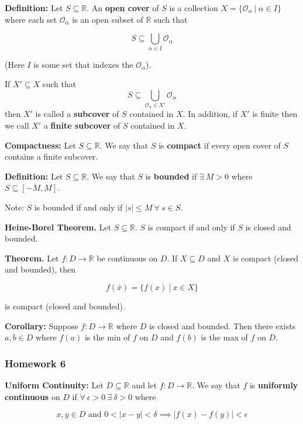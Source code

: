 \textbf{Definition:} Let \(S \subseteq \mathbb{R}\). An \textbf{open cover} of \(S\) is a collection \(X = \{\mathcal{O}_\alpha \ | \ \alpha \in I \} \) where each set \(\mathcal{O}_\alpha\) is an open subset of \(\mathbb{R}\) such that

\[
S \subseteq \bigcup_{\alpha \in I} \mathcal{O}_\alpha
\]

(Here \(I\) is some set that indexes the \(\mathcal{O}_\alpha\)).

If \(X' \subseteq X\) such that \[S \subseteq  \bigcup_{\mathcal{O}_\alpha \in X'} \mathcal{O}_\alpha\]then \(X'\) is called a \textbf{subcover} of \(S\) contained in \(X\). In addition, if \(X'\) is finite then we call \(X'\) a \textbf{finite subcover} of \(S\) contained in \(X\).

\textbf{Compactness:} Let \(S \subseteq \mathbb{R}\). We say that \(S\) is \textbf{compact} if every open cover of \(S\) contains a finite subcover. 

\textbf{Definition:} Let \(S \subseteq \mathbb{R}\). We say that \(S\) is \textbf{bounded} if \(\exists \ M > 0\) where \(S \subseteq [-M, M]\).

Note: \(S\) is bounded if and only if \(|s| \leq M\  \forall \ s \in S \).

\textbf{Heine-Borel Theorem.} Let \(S \subseteq \mathbb{R}\). \(S\) is compact if and only if \(S\) is closed and bounded.


\textbf{Theorem.} Let \(f: D \to \mathbb{R}\) be continuous on \(D\). If \(X \subseteq D\) and \(X\) is compact (closed and bounded), then

\[
f(\bar{x}) = \{f(x) \ | \ x \in X\}
\]

is compact (closed and bounded).

\textbf{Corollary:} Suppose \(f: D \to \mathbb{R}\) where \(D\) is closed and bounded. Then there exists \(a, b \in D\) where \(f(a)\) is the min of \(f\) on \(D\) and \(f(b)\) is the max of \(f\) on \(D\).

\subsubsection{Homework 6}

\textbf{Uniform Continuity:} Let \(D \subseteq \mathbb{R}\) and let \(f: D \to \mathbb{R}\). We say that \(f\) is \textbf{uniformly continuous} on \(D\) if \(\forall \ \epsilon > 0 \ \exists \ \delta > 0\) where

\[
x, y \in D \text{ and } 0 < |x - y| < \delta \implies |f(x) - f(y)| < \epsilon
\]

